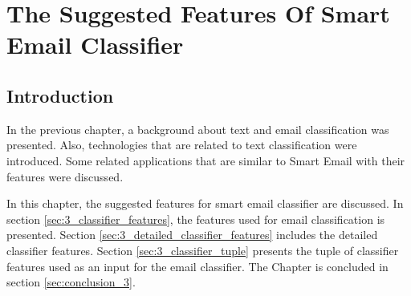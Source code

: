 \label{sec:3_classifier_features}
\label{sec:3_detailed_classifier_features}
\label{sec:3_classifier_tuple}
\label{sec:conclusion_3}

\chapter{The Suggested Features Of Smart Email Classifier} %

\label{Chapter3} %



\section{Introduction}
In the previous chapter, a background about text and email classification was 
presented. Also, technologies that are related to text classification were 
introduced. Some related applications that are similar to Smart Email with their 
features were discussed.

In this chapter, the suggested features for smart email classifier are discussed.
In section \ref{sec:3_classifier_features}, the features used for email 
classification is presented. Section \ref{sec:3_detailed_classifier_features} 
includes the detailed classifier features. Section \ref{sec:3_classifier_tuple} 
presents the tuple of classifier features used as an input for the email 
classifier. The Chapter is concluded in section \ref{sec:conclusion_3}.
\newpage
